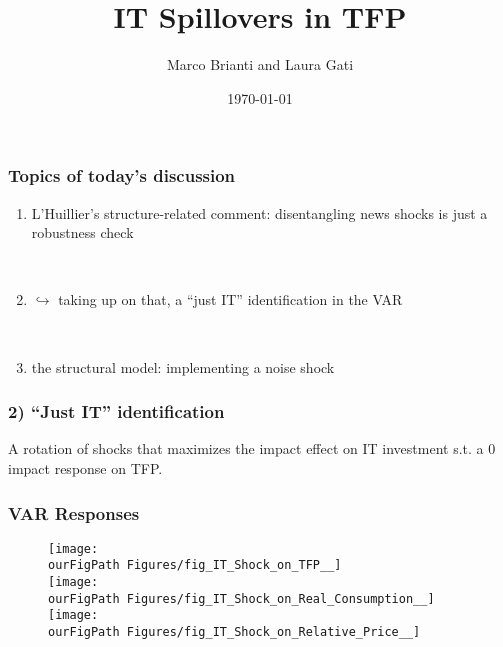 \documentclass{beamer}
\author[Brianti, Gati]{Marco Brianti and Laura Gati}
\institute[Boston College]{Boston College}
\title{IT Spillovers in TFP }
\date{\today}
\def \ourFigPath {../../}
\begin{document}
\begin{frame}

\maketitle


\end{frame}

\begin{frame}
\frametitle{Topics of today's discussion}

\begin{enumerate}
\item L'Huillier's structure-related comment: disentangling news shocks is just a robustness check

\

\item $\hookrightarrow$ taking up on that, a ``just IT'' identification in the VAR

\

\item the structural model: implementing a noise shock
\end{enumerate}


\end{frame}


\begin{frame}
\frametitle{2) ``Just IT'' identification}

A rotation of shocks that maximizes the impact effect on IT investment s.t. a 0 impact response on TFP.
\end{frame}



\begin{frame}
\frametitle{ VAR Responses}

\vspace{-0.2cm}
\begin{figure}
\begin{multicols}{2}
\centering 
\texttt{[image: \\ourFigPath Figures/fig\_IT\_Shock\_on\_TFP\_\_]}\\
\vspace{0.3cm}
\texttt{[image: \\ourFigPath Figures/fig\_IT\_Shock\_on\_Real\_Consumption\_\_]}\\ 
\vspace{0.3cm}
\texttt{[image: \\ourFigPath Figures/fig\_IT\_Shock\_on\_Relative\_Price\_\_]}\\ 

\end{multicols}
\end{figure}


\end{frame}
\end{document}
